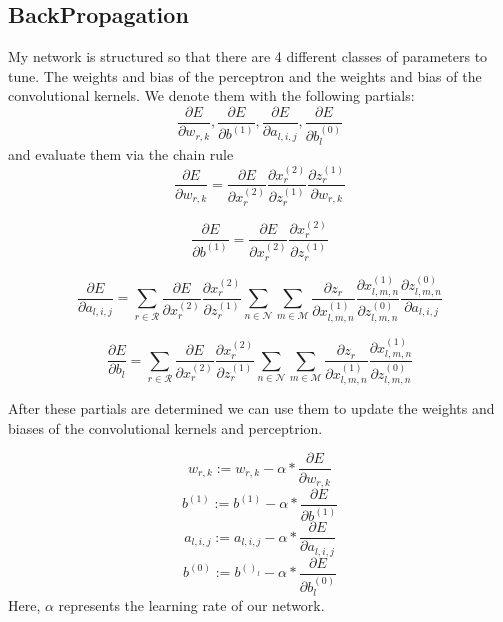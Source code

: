 \documentclass{article}
\begin{document}
\subsection{BackPropagation}
My network is structured so that there are 4 different classes of parameters to tune.  The weights and bias of the perceptron and the weights and bias of the convolutional kernels.  We denote them with the following partials:
\begin{equation}
\frac{\partial E}{\partial w_{r,k}},
\frac{\partial E}{\partial b^{(1)}},
\frac{\partial E}{\partial a_{l,i,j}},
\frac{\partial E}{\partial b^{(0)}_{l}}
\end{equation} 
and evaluate them via the chain rule
\begin{equation}
\frac{\partial E}{\partial w_{r,k}} =
\frac{\partial E}{\partial x_{r}^{(2)}}
\frac{\partial x^{(2)}_{r}}{\partial z_{r}^{(1)}}
\frac{\partial z_{r}^{(1)}}{\partial w_{r,k}}
\end{equation}

\begin{equation}
\frac{\partial E}{\partial b^{(1)}} =
\frac{\partial E}{\partial x_{r}^{(2)}}
\frac{\partial x^{(2)}_{r}}{\partial z_{r}^{(1)}}
\end{equation}

\begin{equation}
\frac{\partial E}{\partial a_{l,i,j}} = 
\sum_{r\in \mathcal{R}}
\frac{\partial E}{\partial x_{r}^{(2)}}
\frac{\partial x_{r}^{(2)}}{\partial z_{r}^{(1)}}
\sum_{n\in \mathcal{N}}
\sum_{m\in \mathcal{M}}
\frac{\partial z_{r}}{\partial x^{(1)}_{l,m,n}}
\frac{\partial x^{(1)}_{l,m,n}}{\partial z^{(0)}_{l,m,n}}
\frac{\partial z_{l,m,n}^{(0)}}{ \partial a_{l,i,j}}
\end{equation}

\begin{equation}
\frac{\partial E}{\partial b_{l}} = 
\sum_{r\in \mathcal{R}}
\frac{\partial E}{\partial x_{r}^{(2)}}
\frac{\partial x_{r}^{(2)}}{\partial z_{r}^{(1)}}
\sum_{n\in \mathcal{N}}
\sum_{m\in \mathcal{M}}
\frac{\partial z_{r}}{\partial x^{(1)}_{l,m,n}}
\frac{\partial x^{(1)}_{l,m,n}}{\partial z^{(0)}_{l,m,n}}
\end{equation}

After these partials are determined we can use them to update the weights and biases of the convolutional kernels and perceptrion. 

\begin{equation}
w_{r,k} := w_{r,k}- \alpha * \frac{\partial E}{\partial w_{r,k}}
\end{equation}
\begin{equation}
b^{(1)} := b^{(1)} - \alpha* \frac{\partial E}{\partial b^{(1)}}
\end{equation}
\begin{equation}
a_{l,i,j} := a_{l,i,j} - \alpha*\frac{\partial E}{\partial a_{l,i,j}}
\end{equation}
\begin{equation}
b^{(0)} := b^{()_{l}} - \alpha*\frac{\partial E}{\partial b^{(0)}_{l}}
\end{equation}
Here, $\alpha$ represents the learning rate of our network.
\end{document}
